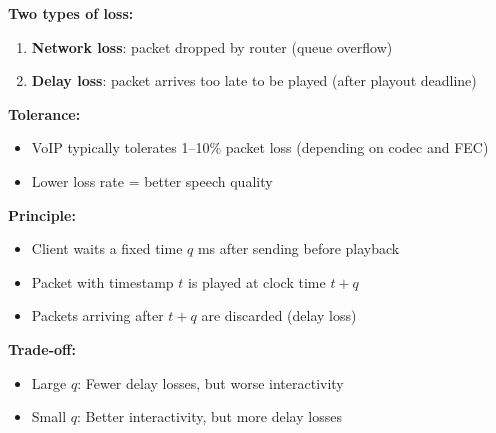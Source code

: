 \begin{tcolorbox}[keybox, title=Packet loss in VoIP]
\textbf{Two types of loss:}
\begin{enumerate}[nosep]
  \item \textbf{Network loss}: packet dropped by router (queue overflow)
  \item \textbf{Delay loss}: packet arrives too late to be played (after playout deadline)
\end{enumerate}

\medskip
\textbf{Tolerance:}
\begin{itemize}[nosep]
  \item VoIP typically tolerates 1--10\% packet loss (depending on codec and FEC)
  \item Lower loss rate = better speech quality
\end{itemize}
\end{tcolorbox}

\begin{tcolorbox}[keybox, title=Fixed Playout Delay]
\textbf{Principle:}
\begin{itemize}[nosep]
  \item Client waits a fixed time $q$ ms after sending before playback
  \item Packet with timestamp $t$ is played at clock time $t + q$
  \item Packets arriving after $t + q$ are discarded (delay loss)
\end{itemize}

\medskip
\textbf{Trade-off:}
\begin{itemize}[nosep]
  \item Large $q$: Fewer delay losses, but worse interactivity
  \item Small $q$: Better interactivity, but more delay losses
\end{itemize}
\end{tcolorbox}

